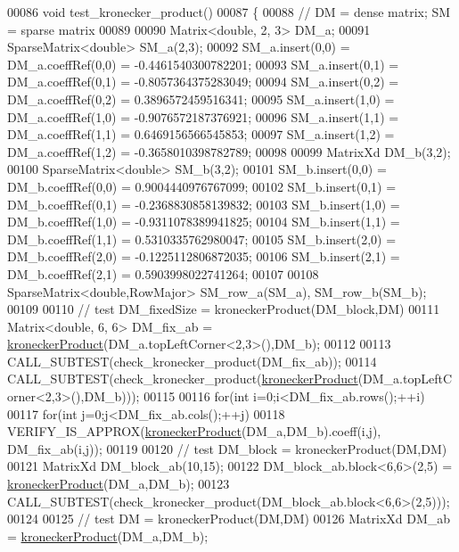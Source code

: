\begin{DoxyCode}
00086 \textcolor{keywordtype}{void} test\_kronecker\_product()
00087 \{
00088   \textcolor{comment}{// DM = dense matrix; SM = sparse matrix}
00089 
00090   Matrix<double, 2, 3> DM\_a;
00091   SparseMatrix<double> SM\_a(2,3);
00092   SM\_a.insert(0,0) = DM\_a.coeffRef(0,0) = -0.4461540300782201;
00093   SM\_a.insert(0,1) = DM\_a.coeffRef(0,1) = -0.8057364375283049;
00094   SM\_a.insert(0,2) = DM\_a.coeffRef(0,2) =  0.3896572459516341;
00095   SM\_a.insert(1,0) = DM\_a.coeffRef(1,0) = -0.9076572187376921;
00096   SM\_a.insert(1,1) = DM\_a.coeffRef(1,1) =  0.6469156566545853;
00097   SM\_a.insert(1,2) = DM\_a.coeffRef(1,2) = -0.3658010398782789;
00098  
00099   MatrixXd             DM\_b(3,2);
00100   SparseMatrix<double> SM\_b(3,2);
00101   SM\_b.insert(0,0) = DM\_b.coeffRef(0,0) =  0.9004440976767099;
00102   SM\_b.insert(0,1) = DM\_b.coeffRef(0,1) = -0.2368830858139832;
00103   SM\_b.insert(1,0) = DM\_b.coeffRef(1,0) = -0.9311078389941825;
00104   SM\_b.insert(1,1) = DM\_b.coeffRef(1,1) =  0.5310335762980047;
00105   SM\_b.insert(2,0) = DM\_b.coeffRef(2,0) = -0.1225112806872035;
00106   SM\_b.insert(2,1) = DM\_b.coeffRef(2,1) =  0.5903998022741264;
00107 
00108   SparseMatrix<double,RowMajor> SM\_row\_a(SM\_a), SM\_row\_b(SM\_b);
00109 
00110   \textcolor{comment}{// test DM\_fixedSize = kroneckerProduct(DM\_block,DM)}
00111   Matrix<double, 6, 6> DM\_fix\_ab = \hyperlink{namespace_eigen_aedd4b7cd1e324ed0769cac2701f4d050}{kroneckerProduct}(DM\_a.topLeftCorner<2,3>(),DM\_b);
00112 
00113   CALL\_SUBTEST(check\_kronecker\_product(DM\_fix\_ab));
00114   CALL\_SUBTEST(check\_kronecker\_product(\hyperlink{namespace_eigen_aedd4b7cd1e324ed0769cac2701f4d050}{kroneckerProduct}(DM\_a.topLeftCorner<2,3>(),DM\_b)));
00115 
00116   \textcolor{keywordflow}{for}(\textcolor{keywordtype}{int} i=0;i<DM\_fix\_ab.rows();++i)
00117     \textcolor{keywordflow}{for}(\textcolor{keywordtype}{int} j=0;j<DM\_fix\_ab.cols();++j)
00118        VERIFY\_IS\_APPROX(\hyperlink{namespace_eigen_aedd4b7cd1e324ed0769cac2701f4d050}{kroneckerProduct}(DM\_a,DM\_b).coeff(i,j), DM\_fix\_ab(i,j));
00119 
00120   \textcolor{comment}{// test DM\_block = kroneckerProduct(DM,DM)}
00121   MatrixXd DM\_block\_ab(10,15);
00122   DM\_block\_ab.block<6,6>(2,5) = \hyperlink{namespace_eigen_aedd4b7cd1e324ed0769cac2701f4d050}{kroneckerProduct}(DM\_a,DM\_b);
00123   CALL\_SUBTEST(check\_kronecker\_product(DM\_block\_ab.block<6,6>(2,5)));
00124 
00125   \textcolor{comment}{// test DM = kroneckerProduct(DM,DM)}
00126   MatrixXd DM\_ab = \hyperlink{namespace_eigen_aedd4b7cd1e324ed0769cac2701f4d050}{kroneckerProduct}(DM\_a,DM\_b);

\end{DoxyCode}
